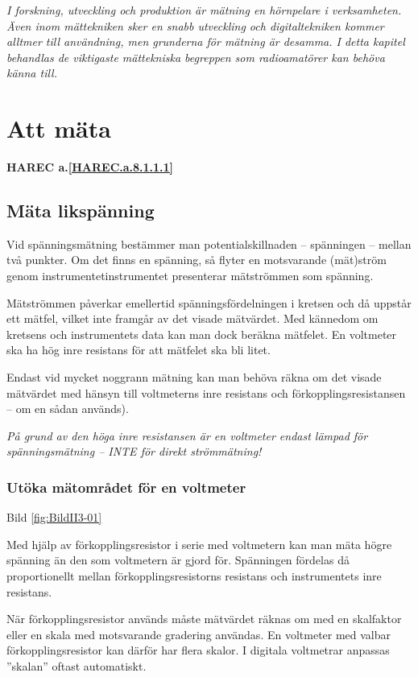 \emph{I forskning, utveckling och produktion är mätning en hörnpelare
  i verksamheten. Även inom mättekniken sker en snabb utveckling och
  digitaltekniken kommer alltmer till användning, men grunderna för
  mätning är desamma. I detta kapitel behandlas de viktigaste
  mättekniska begreppen som radioamatörer kan behöva känna till.}

\section{Att mäta}
\textbf{
HAREC a.\ref{HAREC.a.8.1.1.1}\label{myHAREC.a.8.1.1.1}
}

\subsection{Mäta likspänning}

Vid spänningsmätning bestämmer man potentialskillnaden -- spänningen --
mellan två punkter. Om det finns en spänning, så flyter en motsvarande
(mät)ström genom instrumentetinstrumentet presenterar mätströmmen som
spänning.

Mätströmmen påverkar emellertid spänningsfördelningen i kretsen och då
uppstår ett mätfel, vilket inte framgår av det visade mätvärdet. Med
kännedom om kretsens och instrumentets data kan man dock beräkna
mätfelet. En voltmeter ska ha hög inre resistans för att mätfelet
ska bli litet.

Endast vid mycket noggrann mätning kan man behöva räkna om det visade
mätvärdet med hänsyn till voltmeterns inre resistans och
förkopplingsresistansen -- om en sådan används).

\emph{På grund av den höga inre resistansen är en voltmeter endast
  lämpad för spänningsmätning -- INTE för direkt strömmätning!}

\subsubsection{Utöka mätområdet för en voltmeter}

Bild \ref{fig:BildII3-01}

Med hjälp av förkopplingsresistor i serie med voltmetern kan man mäta
högre spänning än den som voltmetern är gjord för.  Spänningen
fördelas då proportionellt mellan förkopplingsresistorns resistans och
instrumentets inre resistans.

När förkopplingsresistor används måste mätvärdet räknas om med en
skalfaktor eller en skala med motsvarande gradering användas. En
voltmeter med valbar förkopplingsresistor kan därför har flera
skalor. I digitala voltmetrar anpassas ''skalan'' oftast automatiskt.

